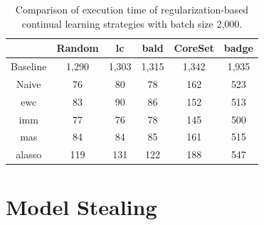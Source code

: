 \begin{table}[h]
    \centering
    \begin{tabular}{c | c c c c c } 
         & Random & \gls{lc} & \gls{bald} & CoreSet & \gls{badge}\\ 
        \hline 
        Baseline & 1,290 & 1,303 & 1,315 & 1,342 & 1,935 \\
        \hline
        Naive & 76 & 80 & 78 & 162 & 523 \\
        \gls{ewc} & 83 & 90 & 86 & 152 & 513\\
        \gls{imm} & 77 & 76 & 78 & 145 & 500\\
        \gls{mas} & 84 & 84 & 85 & 161 & 515\\
        \gls{alasso} & 119 & 131 & 122 & 188 & 547\\
    \end{tabular}
    \caption{Comparison of execution time of regularization-based continual learning strategies
    with batch size 2,000.}
    \label{fig:Appendix:CAL:2000bTimeTable}
\end{table}

\clearpage

\section{Model Stealing}
\label{sec:Appendix:MS}

